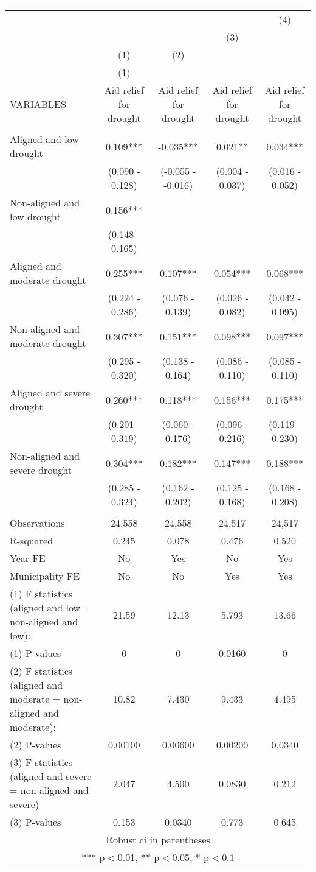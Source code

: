 \begin{tabular}{lcccc}
\multicolumn{5}{c}{} \\ \hline
 &  &  &  & (4) \\
 &  &  & (3) &  \\
 & (1) & (2) &  &  \\
 & (1) &  &  &  \\
VARIABLES & Aid relief for drought & Aid relief for drought & Aid relief for drought & Aid relief for drought \\ \hline
 &  &  &  &  \\
Aligned and low drought & 0.109*** & -0.035*** & 0.021** & 0.034*** \\
 & (0.090 - 0.128) & (-0.055 - -0.016) & (0.004 - 0.037) & (0.016 - 0.052) \\
Non-aligned and low drought & 0.156*** &  &  &  \\
 & (0.148 - 0.165) &  &  &  \\
Aligned and moderate drought & 0.255*** & 0.107*** & 0.054*** & 0.068*** \\
 & (0.224 - 0.286) & (0.076 - 0.139) & (0.026 - 0.082) & (0.042 - 0.095) \\
Non-aligned and moderate drought & 0.307*** & 0.151*** & 0.098*** & 0.097*** \\
 & (0.295 - 0.320) & (0.138 - 0.164) & (0.086 - 0.110) & (0.085 - 0.110) \\
Aligned and severe drought & 0.260*** & 0.118*** & 0.156*** & 0.175*** \\
 & (0.201 - 0.319) & (0.060 - 0.176) & (0.096 - 0.216) & (0.119 - 0.230) \\
Non-aligned and severe drought & 0.304*** & 0.182*** & 0.147*** & 0.188*** \\
 & (0.285 - 0.324) & (0.162 - 0.202) & (0.125 - 0.168) & (0.168 - 0.208) \\
 &  &  &  &  \\
Observations & 24,558 & 24,558 & 24,517 & 24,517 \\
R-squared & 0.245 & 0.078 & 0.476 & 0.520 \\
Year FE & No & Yes & No & Yes \\
Municipality FE & No & No & Yes & Yes \\
(1) F statistics (aligned and low = non-aligned and low): & 21.59 & 12.13 & 5.793 & 13.66 \\
(1) \hspace{1mm} P-values & 0 & 0 & 0.0160 & 0 \\
(2) F statistics (aligned and moderate = non-aligned and moderate): & 10.82 & 7.430 & 9.433 & 4.495 \\
(2) \hspace{1mm} P-values & 0.00100 & 0.00600 & 0.00200 & 0.0340 \\
(3) F statistics (aligned and severe = non-aligned and severe) & 2.047 & 4.500 & 0.0830 & 0.212 \\
 (3) \hspace{1mm} P-values & 0.153 & 0.0340 & 0.773 & 0.645 \\ \hline
\multicolumn{5}{c}{ Robust ci in parentheses} \\
\multicolumn{5}{c}{ *** p$<$0.01, ** p$<$0.05, * p$<$0.1} \\
\end{tabular}

